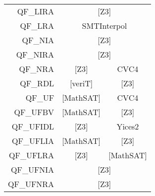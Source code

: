 \begin{table}
{\begin{tabular}{|rccc|}
    \multicolumn{1}{|r|}{QF\_LIRA}   & \multicolumn{3}{c|}{{[}Z3{]}}                                                                                     \\ \cline{2-4} 
    \multicolumn{1}{|r|}{QF\_LRA}    & \multicolumn{3}{c|}{SMTInterpol}                                                                                  \\ \cline{2-4} 
    \multicolumn{1}{|r|}{QF\_NIA}    & \multicolumn{3}{c|}{{[}Z3{]}}                                                                                     \\ \cline{2-4} 
    \multicolumn{1}{|r|}{QF\_NIRA}   & \multicolumn{3}{c|}{{[}Z3{]}}                                                                                     \\ \cline{2-4} 
    \multicolumn{1}{|r|}{QF\_NRA}    & \multicolumn{1}{c|}{{[}Z3{]}}      & \multicolumn{2}{c|}{CVC4}                                                    \\ \cline{2-4} 
    \multicolumn{1}{|r|}{QF\_RDL}    & \multicolumn{1}{c|}{{[}veriT{]}}   & \multicolumn{2}{c|}{{[}Z3{]}}                                                \\ \cline{2-4} 
    \multicolumn{1}{|r|}{QF\_UF}     & \multicolumn{1}{c|}{{[}MathSAT{]}} & \multicolumn{2}{c|}{CVC4}                                                    \\ \cline{2-4} 
    \multicolumn{1}{|r|}{QF\_UFBV}   & \multicolumn{2}{c|}{{[}MathSAT{]}}                                             & \multicolumn{1}{c|}{{[}Z3{]}}    \\ \cline{2-4} 
    \multicolumn{1}{|r|}{QF\_UFIDL}  & \multicolumn{2}{c|}{{[}Z3{]}}                                                  & \multicolumn{1}{c|}{Yices2}      \\ \cline{2-4} 
    \multicolumn{1}{|r|}{QF\_UFLIA}  & \multicolumn{1}{c|}{{[}MathSAT{]}} & \multicolumn{2}{c|}{{[}Z3{]}}                                                \\ \cline{2-4} 
    \multicolumn{1}{|r|}{QF\_UFLRA}  & \multicolumn{1}{c|}{{[}Z3{]}}      & \multicolumn{2}{|c|}{{[}MathSAT{]}}                                          \\ \cline{2-4} 
    \multicolumn{1}{|r|}{QF\_UFNIA}  & \multicolumn{3}{c|}{{[}Z3{]}}                                                                                     \\ \cline{2-4} 
    \multicolumn{1}{|r|}{QF\_UFNRA}  & \multicolumn{3}{c|}{{[}Z3{]}}                                                                                     \\ \cline{2-4} 

\end{tabular}}
\end{table}
